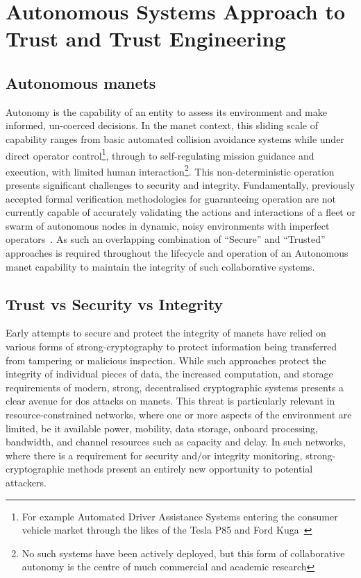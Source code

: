 \section{Autonomous Systems Approach to Trust and Trust Engineering}

\subsection{Autonomous \glspl{manet}}
Autonomy is the capability of an entity to assess its environment and make informed, un-coerced decisions.
In the \gls{manet} context, this sliding scale of capability ranges from basic automated collision avoidance systems while under direct operator control\footnote{For example Automated Driver Assistance Systems entering the consumer vehicle market through the likes of the Tesla P85 and Ford Kuga~\cite{Sawade2016}}, through to self-regulating mission guidance and execution, with limited human interaction\footnote{No such systems have been actively deployed, but this form of collaborative autonomy is the centre of much commercial and academic research\cite{Rajesh2015,Autefage2015,Teke2015}}.
This non-deterministic operation presents significant challenges to security and integrity.
Fundamentally, previously accepted formal verification methodologies for guaranteeing operation are not currently capable of accurately validating the actions and interactions of a fleet or swarm of autonomous nodes in dynamic, noisy environments with imperfect operators~\cite{Teke2015}. 
As such an overlapping combination of ``Secure'' and ``Trusted'' approaches is required throughout the lifecycle and operation of an Autonomous \gls{manet} capability to maintain the integrity of such collaborative systems.

\subsection{Trust vs Security vs Integrity}

Early attempts to secure and protect the integrity of \glspl{manet} have relied on various forms of strong-cryptography to protect information being transferred from tampering or malicious inspection.
While such approaches protect the integrity of individual pieces of data, the increased computation, and storage requirements of modern, strong, decentralised cryptographic systems presents a clear avenue for \gls{dos} attacks on \glspl{manet}.
This threat is particularly relevant in resource-constrained networks, where one or more aspects of the environment are limited, be it available power, mobility, data storage, onboard processing, bandwidth, and channel resources such as capacity and delay.
In such networks, where there is a requirement for security and/or integrity monitoring, strong-cryptographic methods present an entirely new opportunity to potential attackers.


